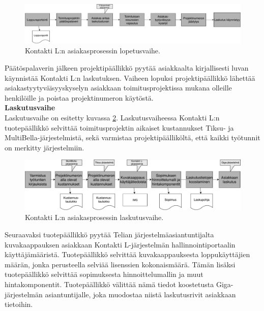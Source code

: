 \documentclass[finnish,12pt,a4paper,pdftex]{article}
\begin{document}
\begin{figure}[!h]
    \centering
    \includegraphics[scale=0.4]{images/lopetusvaihe.pdf}
    \caption{Kontakti L:n asiakasprosessin lopetusvaihe.}
    \label{fig:lopetus}
\end{figure}

\noindent Päätöspalaverin jälkeen projektipäällikkö pyytää asiakkaalta kirjallisesti luvan käynnistää Kontakti L:n laskutuksen. Vaiheen lopuksi projektipäällikkö lähettää asiakastyytyväisyyskyselyn asiakkaan toimitusprojektissa mukana olleille henkilöille ja poistaa projektinumeron käytöstä.\\

\textbf{Laskutusvaihe}\\

\noindent Laskutusvaihe on esitetty kuvassa \ref{fig:laskutus}. Laskutusvaiheessa Kontakti L:n tuotepäällikkö selvittää toimitusprojektin aikaiset kustannukset Tiksu- ja MultiBella-järjestelmistä, sekä varmistaa projektipäälliköltä, että kaikki työtunnit on merkitty järjestelmiin.\\

\begin{figure}[!h]
    \centering
    \includegraphics[scale=0.5]{images/laskutus.pdf}
    \caption{Kontakti L:n asiakasprosessin laskutusvaihe.}
    \label{fig:laskutus}
\end{figure}

\noindent Seuraavaksi tuotepäällikkö pyytää Telian järjestelmäasiantuntijalta kuvakaappauksen asiakkaan Kontakti L-järjestelmän hallinnointiportaalin käyttäjämääristä. Tuotepäällikkö selvittää kuvakaappauksesta loppukäyttäjien määrän, jonka perusteella selviää lisenssien kokonaismäärä. Tämän lisäksi tuotepäällikkö selvittää sopimuksesta hinnoittelumallin ja muut hintakomponentit. Tuotepäällikkö välittää nämä tiedot koostetusta Giga-järjestelmän asiantuntijalle, joka muodostaa niistä laskutusrivit asiakkaan tietoihin.\\
\end{document}
